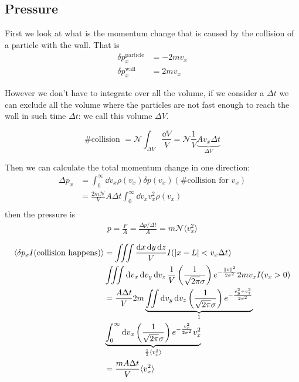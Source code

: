 \documentclass[14pt]{extarticle}
\newcommand{\anglebraces}[1]{
    \langle #1 \rangle
}
\begin{document}
\subsection{Pressure}

First we look at what is the momentum change that is caused by the collision of a particle with the wall.
That is
\begin{align}
    \delta p^\text{particle}_x & = -2 m v_x \\
    \delta p^\text{wall}_x     & = 2 m v_x
\end{align}

However we don't have to integrate over all the volume, if we consider a $\Delta t$ we can exclude all the volume where the particles are not fast enough to reach the wall in such time $\Delta t$: we call this volume $\Delta V$.

\begin{equation}
    \text{\# collision } = \mathscr{N} \int_{\Delta V} \frac{\dd{V}}{V} = \mathscr{N} \frac{1}{V} \underbrace{A v_x \Delta t}_{\Delta V}
\end{equation}

Then we can calculate the total momentum change in one direction:
\begin{align}
    \Delta p_x & = \int_0^\infty \dd{v_x} \rho(v_x) \delta p(v_x) (\text{\# collision for }v_x) \\
               & =\frac{2m \mathscr{N}}{V} A \Delta t \int_0^\infty \dd{v_x} v_x^2 \rho(v_x)    \\
\end{align}
then the pressure is
\begin{align}
    p = \frac{F}{A} = \frac{\Delta p / \Delta t}{A} = m \mathscr{N} \anglebraces{v_x^2}
\end{align}

\begin{align}
    \anglebraces{\delta p_x I(\text{collision happens})} & =
    \iiint \frac{\dd{x} \dd{y} \dd{z}}{V} I(\abs{x - L} < v_x \Delta t) \nonumber                                                                                                                                         \\
                                                         & \iiint \dd{v_x} \dd{v_y} \dd{v_z} \frac{1}{V} \left(\frac{1}{\sqrt{2 \pi} \sigma}\right) e^{-\frac{\norm{\vec v}^2}{2 \sigma^2}} 2 m v_x I(v_x > 0)            \\
                                                         & = \frac{A \Delta t}{V} 2m \underbrace{\iint  \dd{v_y} \dd{v_z} \left(\frac{1}{\sqrt{2 \pi} \sigma}\right) e^{-\frac{v_y^2 + v_z^2}{2 \sigma^2}}}_{1} \nonumber \\
                                                         & \underbrace{\int_0^\infty \dd{v_x} \left(\frac{1}{\sqrt{2 \pi} \sigma}\right) e^{-\frac{v_x^2 }{2 \sigma^2}}v_x^2}_{\frac{1}{2} \anglebraces{v_x^2}}           \\
                                                         & = \frac{m A \Delta t}{V} \anglebraces{v_x^2}
\end{align}
\end{document}
